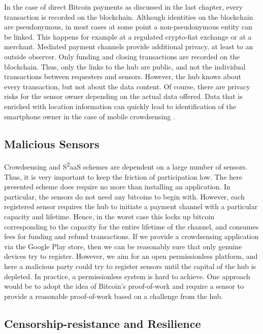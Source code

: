 In the case of direct Bitcoin payments as discussed in the last chapter, every transaction is recorded on the blockchain. Although identities on the blockchain are pseudonymous, in most cases at some point a non-pseudonymous entity can be linked. This happens for example at a regulated crypto-fiat exchange or at a merchant. 
Mediated payment channels provide additional privacy, at least to an outside observer. Only funding and closing transactions are recorded on the blockchain. Thus, only the links to the hub are public, and not the individual transactions between requesters and sensors. However, the hub knows about every transaction, but not about the data content. Of course, there are privacy risks for the sensor owner depending on the actual data offered. Data that is enriched with location information can quickly lead to identification of the smartphone owner in the case of mobile crowdsensing \parencite{de2013unique}. 

\subsection{Malicious Sensors}
\label{sec:s2aas_micro_eval_malsens}

Crowdsensing and S\textsuperscript{2}aaS schemes are dependent on a large number of sensors. Thus, it is very important to keep the friction of participation low. The here presented scheme does require no more than installing an application. In particular, the sensors do not need any bitcoins to begin with. However, each registered sensor requires the hub to initiate a payment channel with a particular capacity and lifetime. Hence, in the worst case this locks up bitcoin corresponding to the capacity for the entire lifetime of the channel, and consumes fees for funding and refund transactions. If we provide a crowdsensing application via the Google Play store, then we can be reasonably sure that only genuine devices try to register. However, we aim for an open permissionless platform, and here a malicious party could try to register sensors until the capital of the hub is depleted. In practice, a permissionless system is hard to achieve. One approach would be to adopt the idea of Bitcoin's proof-of-work and require a sensor to provide a reasonable proof-of-work based on a challenge from the hub.

\subsection{Censorship-resistance and Resilience}

